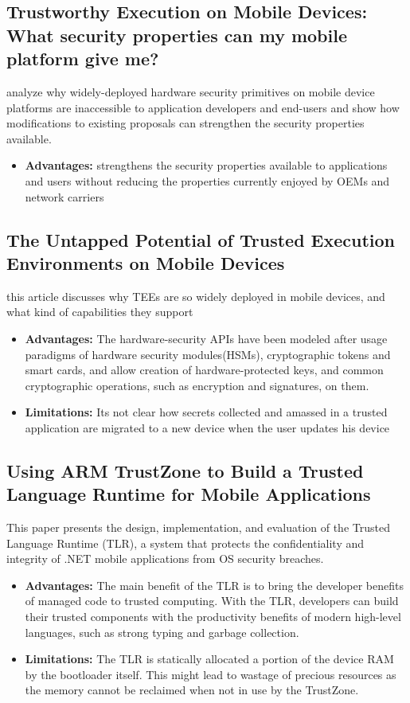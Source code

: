 \documentclass[conference]{IEEEtran}
\begin{document}
\subsection{Trustworthy Execution on Mobile Devices: What security properties can my mobile platform give me?}

analyze why widely-deployed hardware security primitives on mobile device platforms are inaccessible to application developers and end-users and show how modifications to existing proposals can strengthen the security properties available.
\begin{itemize}
    \item \textbf{Advantages:} strengthens the security properties available to applications and users without reducing the properties currently enjoyed by OEMs and network carriers
\end{itemize}


\subsection{The Untapped Potential of Trusted Execution Environments on Mobile Devices}
this article discusses why TEEs are so widely deployed in mobile devices, and what kind of capabilities they support
\begin{itemize}
    \item \textbf{Advantages:} The hardware-security APIs have been modeled after usage paradigms of hardware security modules(HSMs), cryptographic tokens and smart cards, and allow creation of hardware-protected keys, and common cryptographic operations, such as encryption and signatures, on them.
    \item \textbf{Limitations:} Its not clear how secrets collected and amassed in a trusted application are migrated to a new device when the user updates his device
\end{itemize}


\subsection{Using ARM TrustZone to Build a Trusted Language Runtime for Mobile Applications}

This paper presents the design, implementation, and evaluation of the Trusted Language Runtime (TLR), a system that protects the confidentiality and integrity of .NET mobile applications from OS security breaches.
\begin{itemize}
    \item \textbf{Advantages:} The main benefit of the TLR is to bring the developer benefits of managed code to trusted computing. With the TLR, developers can build their trusted components with the productivity benefits of modern high-level languages, such as strong typing and garbage collection.
    \item \textbf{Limitations:} The TLR is  statically allocated a portion of the device RAM by the bootloader itself. This might lead to wastage of precious resources as the memory cannot be reclaimed when not in use by the TrustZone.
\end{itemize}
\end{document}
